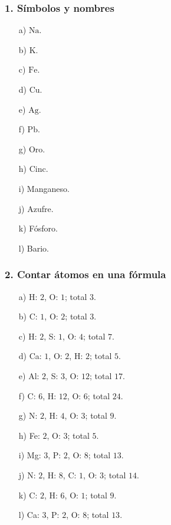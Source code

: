 \subsubsection*{1. Símbolos y nombres}
\begin{enumerate}
    \item[a)] $\mathrm{Na}$.
    \item[b)] $\mathrm{K}$.
    \item[c)] $\mathrm{Fe}$.
    \item[d)] $\mathrm{Cu}$.
    \item[e)] $\mathrm{Ag}$.
    \item[f)] $\mathrm{Pb}$.
    \item[g)] Oro.
    \item[h)] Cinc.
    \item[i)] Manganeso.
    \item[j)] Azufre.
    \item[k)] Fósforo.
    \item[l)] Bario.
\end{enumerate}

\subsubsection*{2. Contar átomos en una fórmula}
\begin{enumerate}
    \item[a)] H: $2$, O: $1$; total $3$.
    \item[b)] C: $1$, O: $2$; total $3$.
    \item[c)] H: $2$, S: $1$, O: $4$; total $7$.
    \item[d)] Ca: $1$, O: $2$, H: $2$; total $5$.
    \item[e)] Al: $2$, S: $3$, O: $12$; total $17$.
    \item[f)] C: $6$, H: $12$, O: $6$; total $24$.
    \item[g)] N: $2$, H: $4$, O: $3$; total $9$.
    \item[h)] Fe: $2$, O: $3$; total $5$.
    \item[i)] Mg: $3$, P: $2$, O: $8$; total $13$.
    \item[j)] N: $2$, H: $8$, C: $1$, O: $3$; total $14$.
    \item[k)] C: $2$, H: $6$, O: $1$; total $9$.
    \item[l)] Ca: $3$, P: $2$, O: $8$; total $13$.
\end{enumerate}

